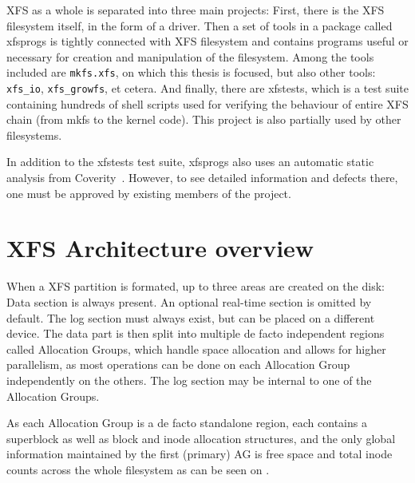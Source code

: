 XFS as a whole is separated into three main projects: First, there is the
XFS filesystem itself, in the form of a driver. Then a set of tools
in a package called xfsprogs is tightly connected with XFS filesystem and
contains programs useful or necessary for creation and manipulation of the
filesystem. Among the tools included are {\tt mkfs.xfs}, on which this
thesis is focused, but also other tools: {\tt xfs\_io},
{\tt xfs\_growfs}, et cetera. And finally, there are xfstests, which is a
test suite containing hundreds of shell scripts used for verifying the
behaviour of entire XFS chain (from mkfs to the kernel code). This project
is also partially used by other filesystems.

In addition to the xfstests test suite, xfsprogs also uses an automatic
static analysis from Coverity~\cite{CoverityXfsprogs}. However, to see
detailed information and defects there, one must be approved by existing
members of the project.


\section{XFS Architecture overview}\label{chap:xfs:overview}

When a XFS partition is formated, up to three areas are created on the
disk: Data section is always present. An optional real-time section is
omitted by default. The log section must always exist, but can be placed on a
different device. The data part is then split into multiple de
facto independent regions called Allocation Groups, which handle space
allocation and allows for higher parallelism, as most operations can be
done on each Allocation Group independently on the others. The log section
may be internal to one of the Allocation Groups.

As each Allocation Group is a de facto standalone region, each contains
a superblock as well as block and inode allocation structures, and the only global
information maintained by the first (primary) AG is free space and total
inode counts across the whole filesystem as can be seen
on .


